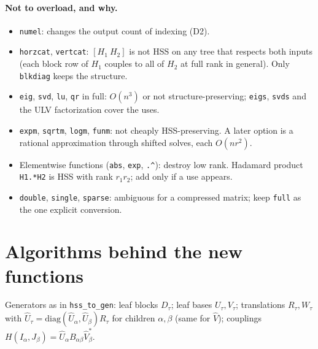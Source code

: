 \documentclass[11pt]{article}
\newcommand{\code}[1]{\texttt{#1}}
\begin{document}
\paragraph{Not to overload, and why.}
\begin{itemize}
\item \code{numel}: changes the output count of indexing (D2).
\item \code{horzcat}, \code{vertcat}: $[H_1~H_2]$ is not HSS on any tree that respects both inputs (each block
row of $H_1$ couples to all of $H_2$ at full rank in general). Only \code{blkdiag} keeps the structure.
\item \code{eig}, \code{svd}, \code{lu}, \code{qr} in full: $O(n^3)$ or not structure-preserving; \code{eigs},
\code{svds} and the ULV factorization cover the uses.
\item \code{expm}, \code{sqrtm}, \code{logm}, \code{funm}: not cheaply HSS-preserving. A later option is a
rational approximation through shifted solves, each $O(nr^2)$.
\item Elementwise functions (\code{abs}, \code{exp}, \code{.\^{}}): destroy low rank. Hadamard product
\code{H1.*H2} is HSS with rank $r_1r_2$; add only if a use appears.
\item \code{double}, \code{single}, \code{sparse}: ambiguous for a compressed matrix; keep \code{full} as the one
explicit conversion.
\end{itemize}

\section{Algorithms behind the new functions}\label{sec:algorithms}
Generators as in \code{hss\_to\_gen}: leaf blocks $D_\tau$; leaf bases $U_\tau,V_\tau$; translations
$R_\tau,W_\tau$ with $\hat U_\tau=\mathrm{diag}(\hat U_{\alpha},\hat U_{\beta})R_\tau$ for children
$\alpha,\beta$ (same for $\hat V$); couplings $H(I_\alpha,J_\beta)=\hat U_\alpha B_{\alpha\beta}\hat V_\beta^*$.
\end{document}
